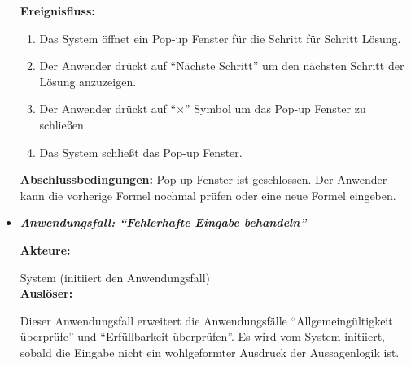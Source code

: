 \begin{itemize}
\textbf{Ereignisfluss:}
\begin{enumerate}
\addtolength{\itemindent}{0cm}
\item Das System öffnet ein Pop-up Fenster für die Schritt für Schritt Lösung.
\addtolength{\itemindent}{1cm}
\item  Der Anwender drückt auf ``Nächste Schritt'' um den nächsten Schritt der Lösung anzuzeigen.
\item  Der Anwender drückt auf ``$\times$'' Symbol um das Pop-up Fenster zu schließen.
\addtolength{\itemindent}{0cm}
\end{enumerate}
\begin{enumerate}
  \setcounter{enumi}{3}
 \item Das System schließt das Pop-up Fenster.
\end{enumerate}

\textbf{Abschlussbedingungen:}
Pop-up Fenster ist geschlossen. Der Anwender kann die vorherige Formel nochmal prüfen oder eine neue Formel eingeben.\\


\item \textit{\textbf{Anwendungsfall: ``Fehlerhafte Eingabe behandeln''}}

\textbf{Akteure:}

System (initiiert den Anwendungsfall)\\

\textbf{Auslöser:}

Dieser Anwendungsfall erweitert die Anwendungsfälle ``Allgemeingültigkeit überprüfe'' und ``Erfüllbarkeit überprüfen''. Es wird vom System initiiert, sobald die Eingabe nicht ein wohlgeformter Ausdruck der Aussagenlogik ist.\\


\end{itemize}
